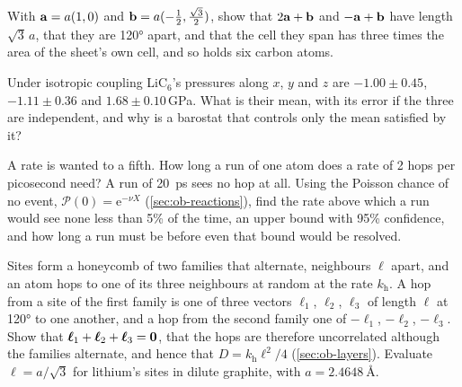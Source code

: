 \begin{exercise}
\label{ex:ip-supercell}
With $\bm{\mathrm{a}} = a(1, 0)$ and $\bm{\mathrm{b}} = a(-\frac12, \frac{\sqrt3}{2})$, show
that $2\bm{\mathrm{a}} + \bm{\mathrm{b}}$ and $-\bm{\mathrm{a}} + \bm{\mathrm{b}}$ have length $\sqrt3\,a$,
that they are \ang{120} apart, and that the cell they span has three times
the area of the sheet's own cell, and so holds six carbon atoms.
\end{exercise}

\begin{exercise}
\label{ex:ip-isotropic}
Under isotropic coupling LiC$_6$'s pressures along $x$, $y$ and $z$ are
$-1.00 \pm 0.45$, $-1.11 \pm 0.36$ and $1.68 \pm 0.10$\,\si{\giga\pascal}.
What is their mean, with its error if the three are independent, and why
is a barostat that controls only the mean satisfied by it?
\end{exercise}

\begin{exercise}
\label{ex:ip-rate}
A rate is wanted to a fifth. How long a run of one atom does a rate of 2
hops per picosecond need? A run of \SI{20}{\pico\second} sees no hop at
all. Using the Poisson chance of no event, $\mathcal{P}(0) =
\mathrm{e}^{-\nu X}$ (\cref{sec:ob-reactions}), find the rate above which
a run would see none less than 5\% of the time, an upper bound with 95\%
confidence, and how long a run must be before even that bound would be
resolved.
\end{exercise}

\begin{exercise}
\label{ex:ip-honeycomb}
Sites form a honeycomb of two families that alternate, neighbours $\ell$
apart, and an atom hops to one of its three neighbours at random at the
rate $k_{\mathrm h}$. A hop from a site of the first family is one of
three vectors $\boldsymbol{\ell}_1$, $\boldsymbol{\ell}_2$,
$\boldsymbol{\ell}_3$ of length $\ell$ at \ang{120} to one another, and a
hop from the second family one of $-\boldsymbol{\ell}_1$,
$-\boldsymbol{\ell}_2$, $-\boldsymbol{\ell}_3$. Show that
$\boldsymbol{\ell}_1 + \boldsymbol{\ell}_2 + \boldsymbol{\ell}_3 =
\bm{\mathrm{0}}$, that the hops are therefore uncorrelated although the families
alternate, and hence that $D = k_{\mathrm h}\ell^2/4$
(\cref{sec:ob-layers}). Evaluate $\ell = a/\sqrt3$ for lithium's sites in
dilute graphite, with $a = \SI{2.4648}{\angstrom}$.
\end{exercise}

